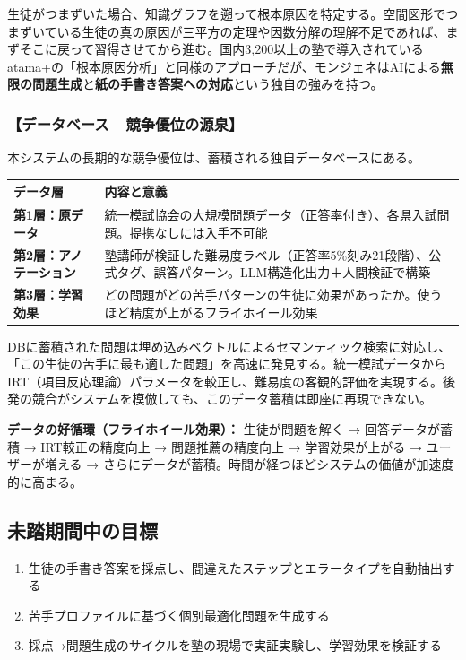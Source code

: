 \documentclass[paper=a4,fontsize=10.5bp,jafontsize=10.5bp,twocolumn]{jlreq}
\begin{document}
生徒がつまずいた場合、知識グラフを遡って根本原因を特定する。空間図形でつまずいている生徒の真の原因が三平方の定理や因数分解の理解不足であれば、まずそこに戻って習得させてから進む。国内3,200以上の塾で導入されているatama+の「根本原因分析」と同様のアプローチだが、モンジェネはAIによる\textbf{無限の問題生成}と\textbf{紙の手書き答案への対応}という独自の強みを持つ。

\subsubsection{【データベース---競争優位の源泉】}

本システムの長期的な競争優位は、蓄積される独自データベースにある。


\begin{footnotesize}\noindent
\begin{tabularx}{\linewidth}{>{\bfseries}l X}
\toprule
データ層 & 内容と意義 \\
\midrule
第1層：原データ & 統一模試協会の大規模問題データ（正答率付き）、各県入試問題。提携なしには入手不可能 \\
第2層：アノテーション & 塾講師が検証した難易度ラベル（正答率5\%刻み21段階）、公式タグ、誤答パターン。LLM構造化出力＋人間検証で構築 \\
第3層：学習効果 & どの問題がどの苦手パターンの生徒に効果があったか。使うほど精度が上がるフライホイール効果 \\
\bottomrule
\end{tabularx}
\end{footnotesize}


DBに蓄積された問題は埋め込みベクトルによるセマンティック検索に対応し、「この生徒の苦手に最も適した問題」を高速に発見する。統一模試データからIRT（項目反応理論）パラメータを較正し、難易度の客観的評価を実現する。後発の競合がシステムを模倣しても、このデータ蓄積は即座に再現できない。


\begin{graybox}
\textbf{データの好循環（フライホイール効果）：}
生徒が問題を解く → 回答データが蓄積 → IRT較正の精度向上 → 問題推薦の精度向上 → 学習効果が上がる → ユーザーが増える → さらにデータが蓄積。時間が経つほどシステムの価値が加速度的に高まる。
\end{graybox}

\subsection{未踏期間中の目標}

\begin{enumerate}[leftmargin=2em]
  \item 生徒の手書き答案を採点し、間違えたステップとエラータイプを自動抽出する
  \item 苦手プロファイルに基づく個別最適化問題を生成する
  \item 採点→問題生成のサイクルを塾の現場で実証実験し、学習効果を検証する
\end{enumerate}
\end{document}
